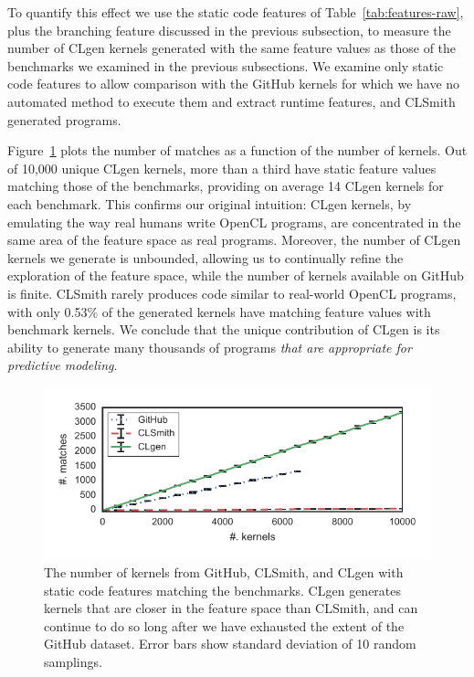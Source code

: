 To quantify this effect we use the static code features of Table~\ref{tab:features-raw}, plus the branching feature discussed in the previous subsection, to measure the number of CLgen kernels generated with the same feature values as those of the benchmarks we examined in the previous subsections. We examine only static code features to allow comparison with the GitHub kernels for which we have no automated method to execute them and extract runtime features, and CLSmith generated programs.

Figure~\ref{fig:nn} plots the number of matches as a function of the number of kernels. Out of 10,000 unique CLgen kernels, more than a third have static feature values matching those of the benchmarks, providing on average 14 CLgen kernels for each benchmark. This confirms our original intuition: CLgen kernels, by emulating the way real humans write OpenCL programs, are concentrated in the same area of the feature space as real programs. Moreover, the number of CLgen kernels we generate is unbounded, allowing us to continually refine the exploration of the feature space, while the number of kernels available on GitHub is finite. CLSmith rarely produces code similar to real-world OpenCL programs, with only 0.53\% of the generated kernels have matching feature values with benchmark kernels. We conclude that the unique contribution of CLgen is its ability to generate many thousands of programs \textit{that are appropriate for predictive modeling}.

\begin{figure}
  \includegraphics[width=\columnwidth]{img/closeness} %
  \caption{The number of kernels from GitHub, CLSmith, and CLgen with static code features matching the benchmarks. CLgen generates kernels that are closer in the feature space than CLSmith, and can continue to do so long after we have exhausted the extent of the GitHub dataset. Error bars show standard deviation of 10 random samplings.}%
  \label{fig:nn}
\end{figure}
